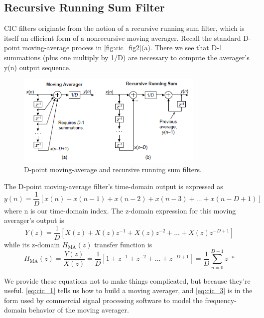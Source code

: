 \subsection{Recursive Running Sum Filter}
CIC filters originate from the notion of a recursive running sum filter, which is itself an efficient form of a nonrecursive moving averager. Recall the standard D-point moving-average process in \autoref{fig:cic_fig2}(a). There we see that D-1 summations (plus one multiply by 1/D) are necessary to compute the averager's y(n) output sequence.
\begin{figure}[!ht]
    \centering
    \includegraphics[width=0.8\textwidth]{images/CIC_Filter/CIC_digital_filters_fig2.png}
    \caption{D-point moving-average and recursive running sum filters.}
    \label{fig:cic_fig2}
\end{figure}
The D-point moving-average filter's time-domain output is expressed as 
\begin{equation}\label{eq:cic_1}
y(n)=\frac{1}{D}[x(n)+x(n-1)+x(n-2)+x(n-3)+\ldots+x(n-D+1)]
\end{equation}
where n is our time-domain index. The z-domain expression for this moving averager's output is 
\begin{equation}\label{eq:cic_2}
Y(z)=\frac{1}{D}\left[X(z)+X(z) z^{-1}+X(z) z^{-2}+\ldots+X(z) z^{-D+1}\right]
\end{equation}
while its z-domain $H_{\mathrm{MA}}(z)$ transfer function is 
\begin{equation}\label{eq:cic_3}
H_{\mathrm{MA}}(z)=\frac{Y(z)}{X(z)}=\frac{1}{D}\left[1+z^{-1}+z^{-2}+\ldots+z^{-D+1}\right]=\frac{1}{D} \sum_{n=0}^{D-1} z^{-n}
\end{equation}

We provide these equations not to make things complicated, but because they're useful. \autoref{eq:cic_1} tells us how to build a moving averager, and \autoref{eq:cic_3} is in the form used by commercial signal processing software to model the frequency-domain behavior of the moving averager. 


